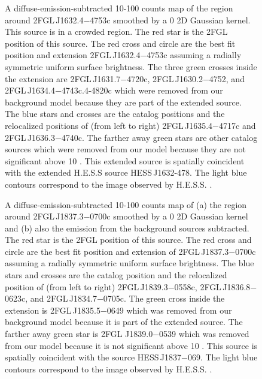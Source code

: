 \documentclass[12pt,preprint]{aastex}
\newif\ifcolorfigure
\newcommand{\gev}{\text{GeV}\xspace}
\newcommand{\tev}{\text{TeV}\xspace}
\begin{document}
\begin{figure}
    \ifcolorfigure
      \plotone{source_plots/source_HESS_J1632-478_color.eps}
    \else
    \fi
  \caption{A diffuse-emission-subtracted 10-100
  \gev counts map of the region around 2FGL\,J1632.4$-$4753c smoothed by
  a 0 2D Gaussian kernel.  This source is in a crowded region.
  The red star is the 2FGL position of this source.  The red
  cross and circle are the best fit position and extension 2FGL\,J1632.4$-$4753c 
  assuming a radially
  symmetric uniform surface brightness.
  The three
  green crosses inside the extension are 2FGL\,J1631.7$-$4720c, 
  2FGL\,J1630.2$-$4752, and 2FGL\,J1634.4$-$4743c.4-4820c
  which were removed from our background model because they are part
  of the extended source.  The blue stars and crosses are the catalog
  positions and the relocalized positions of (from left to right)
  2FGL\,J1635.4$-$4717c and 2FGL\,J1636.3$-$4740c.  The farther away green
  stars are other catalog sources which were removed from our model because they are
  not significant above 10 \gev.  This extended source is spatially
  coincident with the extended H.E.S.S source HESS\,J1632-478.
  The light blue contours correspond to the \tev image observed by H.E.S.S.
  \citep{hess_plane_survey}.
  }\label{1FGL_J1632.9-4802c}
\end{figure}


\begin{figure}
    \ifcolorfigure
      \plotone{source_plots/source_HESS_J1837-069_color.eps}
    \else
    \fi
  \caption{
  A diffuse-emission-subtracted 10-100 \gev counts map of
  (a)
  the region around 2FGL\,J1837.3$-$0700c smoothed by a 0 2D Gaussian
  kernel and (b) also the emission from the background 
  sources subtracted.  The red
  star is the 2FGL position of this source. The red cross and circle
  are the best fit position and extension  of 2FGL\,J1837.3$-$0700c 
  assuming a radially
  symmetric uniform surface brightness. The blue stars and crosses are the
  catalog position and the relocalized position of (from left to right)
  2FGL\,J1839.3$-$0558c, 2FGL\,J1836.8$-$0623c, and 2FGL\,J1834.7$-$0705c.
  The green cross inside the extension is 2FGL\,J1835.5$-$0649 which
  was removed from our background model because it is part of the extended source.  The farther
  away green star is 2FGL J1839.0$-$0539 which was removed from
  our model because
  it is not significant above 10 \gev.  This source is spatially
  coincident with the \tev source HESS\,J1837$-$069.  The light blue
  contours correspond to the \tev image observed by H.E.S.S.
  \citep{hess_plane_survey}.}\label{1FGL_J1837.5-0659c}
\end{figure}
\end{document}
